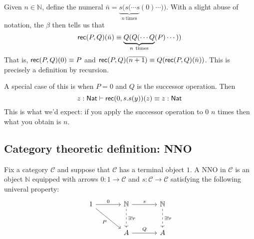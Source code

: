 \documentclass[12pt]{article}
\begin{document}
Given $n \in \mathbb{N}$, define the numeral $\bar n = \underbrace{s(s(\cdots s}_{n\ \text{times}}(0) \cdots ))$. With a slight abuse of notation, the $\beta$ then tells us that
\begin{equation*}
\mathsf{rec}(P,Q)(\bar n) \equiv \underbrace{Q(Q(\cdots Q}_{n\ \text{times}}(P) \cdots))
\end{equation*}
That is, $\mathsf{rec}(P,Q)(0) \equiv P$ and $\mathsf{rec}(P,Q)(\overline{n+1}) \equiv Q(\mathsf{rec}(P,Q)(\bar n))$. This is precisely a definition by recursion.

A special case of this is when $P=0$ and $Q$ is the successor operation. Then
\begin{equation*}
z : \mathsf{Nat} \vdash \mathsf{rec}(0,s.s(y))(z) \equiv z : \mathsf{Nat}
\end{equation*}
This is what we'd expect: if you apply the successor operation to $0$ $n$ times then what you obtain is $n$.

\begin{comment}
Another consequence of the $\eta$ rule is a \emph{commuting conversion}:
\begin{equation*}
    \Gamma, z : \Nat \vdash [\rec(0,y.s(y))(z)/z]M \equiv \rec([0/z]M, y.[s(y)/z]M)(z)
\end{equation*}
This has importance for proof theory.
\end{comment}

\subsection{Category theoretic definition: NNO}
Fix a category $\mathcal{C}$ and suppose that $\mathcal{C}$ has a terminal object $1$. A \acl{NNO} in $\mathcal{C}$ is an object $\mathbb{N}$ equipped with arrows $0 : 1 \to \mathcal{C}$ and $s : \mathcal{C} \to \mathcal{C}$ satisfying the following univeral property:
\[
\begin{tikzcd}[column sep=large,row sep=large]
1\rar{0}\drar[swap]{P} & \mathbb{N}\rar{s}\dar[dashed]{{\exists!}r} & \mathbb{N}\dar[dashed]{{\exists!}r}	\\
{} & A\rar{Q} & A
\end{tikzcd}
\]
\end{document}
